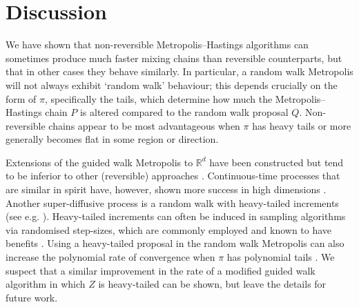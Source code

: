 \documentclass{article}
\theoremstyle{definition}
\theoremstyle{plain}
\newtheorem{lemma}[definition]{Lemma}
\begin{document}




\section{Discussion}

We have shown that non-reversible Metropolis--Hastings algorithms can sometimes produce much faster mixing chains than reversible counterparts, but that in other cases they behave similarly.  In particular, a random walk Metropolis will not always exhibit `random walk' behaviour; this depends crucially on the form of $\pi$, specifically the tails, which determine how much the Metropolis--Hastings chain $P$ is altered compared to the random walk proposal $Q$.  Non-reversible chains appear to be most advantageous when $\pi$ has heavy tails or more generally becomes flat in some region or direction.

Extensions of the guided walk Metropolis to $\mathbb{R}^d$ have been constructed but tend to be inferior to other (reversible) approaches \citep{gustafson2004value}.  Continuous-time processes that are similar in spirit have, however, shown more success in high dimensions \citep{bierkens2019zig}.  Another super-diffusive process is a random walk with heavy-tailed increments (see e.g. \citep{metzler2000random,klafter1987stochastic}).  Heavy-tailed increments can often be induced in sampling algorithms via randomised step-sizes, which are commonly employed and known to have benefits \cite{grazzi2026randomized}.  Using a heavy-tailed proposal in the random walk Metropolis can also increase the polynomial rate of convergence when $\pi$ has polynomial tails \cite{jarner2007convergence}.  We suspect that a similar improvement in the rate of a modified guided walk algorithm in which $Z$ is heavy-tailed can be shown, but leave the details for future work.  
\end{document}
